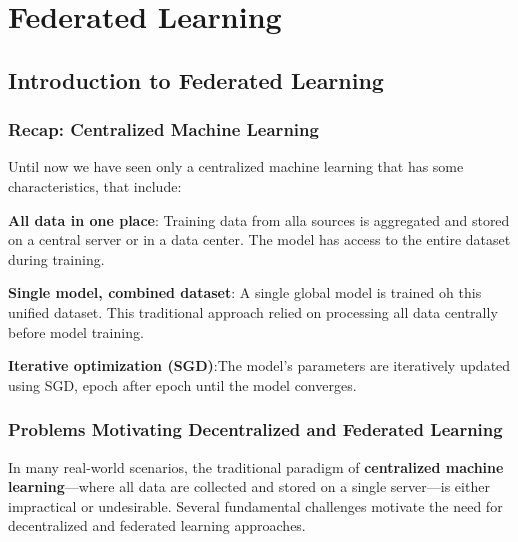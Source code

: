 \chapter{Federated Learning}

\section{Introduction to Federated Learning}

\subsection{Recap: Centralized Machine Learning}
Until now we have seen only a centralized machine learning that has some characteristics, that include:
\begin{compactitemize}
    \item \textbf{All data in one place}: Training data from alla sources is aggregated and stored on a central server or in a data center. The model has access to the entire dataset during training.
    \item \textbf{Single model, combined dataset}: A single global model is trained oh this unified dataset. This traditional approach relied on processing all data centrally before model training.
    \item \textbf{Iterative optimization (SGD)}:The model's parameters are iteratively updated using SGD, epoch after epoch until the model converges.
\end{compactitemize}

\subsection{Problems Motivating Decentralized and Federated Learning}

In many real-world scenarios, the traditional paradigm of \textbf{centralized machine
learning}—where all data are collected and stored on a single server—is either impractical
or undesirable. Several fundamental challenges motivate the need for decentralized and
federated learning approaches.

